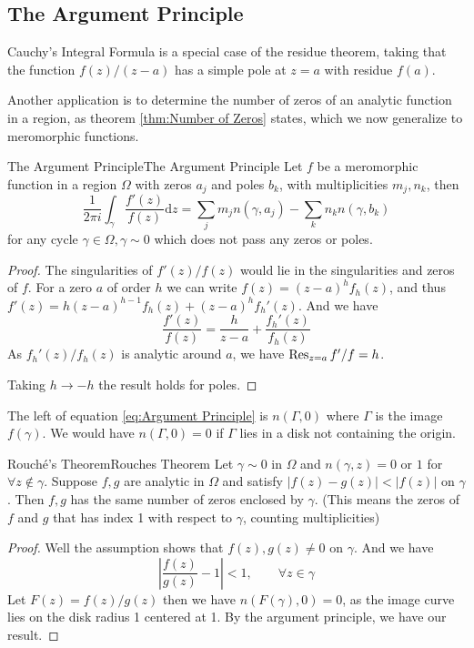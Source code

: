 \documentclass[../main.tex]{subfiles}
\begin{document}
\subsection{The Argument Principle}

Cauchy's Integral Formula is a special case of the residue theorem, taking that the function $f(z) / (z-a)$ has a simple pole at $z=a$ with residue $f(a)$.

Another application is to determine the number of zeros of an analytic function in a region, as theorem \ref{thm:Number of Zeros} states, which we now generalize to meromorphic functions.

\begin{theorem}{The Argument Principle}{The Argument Principle}
	Let $f$ be a meromorphic function in a region $\Omega$ with zeros $a_j$ and poles $b_k$, with multiplicities $m_j,n_k$, then
	\begin{equation}\label{eq:Argument Principle}
		\frac{1}{2 \pi i} \int_{\gamma} \frac{f'(z)}{f(z)} \mathrm{d} z = \sum_{j} m_j n(\gamma,a_j) - \sum_{k} n_k n(\gamma,b_k)
	\end{equation}
	for any cycle $\gamma\in \Omega, \gamma\sim 0$ which does not pass any zeros or poles.
\end{theorem}
\begin{proof}
	The singularities of $f'(z) / f(z)$ would lie in the singularities and zeros of $f$. For a zero $a$ of order $h$ we can write $f(z) = (z-a)^hf_h(z)$, and thus $f'(z) = h(z-a)^{h-1}f_h(z) + (z-a)^h f_h'(z)$. And we have
	\begin{equation*}
		\frac{f'(z)}{f(z)} = \frac{h}{z-a} + \frac{f_h'(z)}{f_h(z)}
	\end{equation*}
	As $f_h'(z) / f_h(z)$ is analytic around $a$, we have $\operatorname{Res}_{z=a} f' / f = h$.
	
	Taking $h \rightarrow -h$ the result holds for poles.
\end{proof}

The left of equation \eqref{eq:Argument Principle} is $n(\Gamma,0)$ where $\Gamma$ is the image $f(\gamma)$. We would have $n(\Gamma,0)=0$ if $\Gamma$ lies in a disk not containing the origin.

\begin{theorem}{Rouch\'e's Theorem}{Rouches Theorem}
	Let $\gamma\sim 0$ in $\Omega$ and $n(\gamma,z)=0$ or $1$ for $\forall z\notin \gamma$. Suppose $f,g$ are analytic in $\Omega$ and satisfy $\left|f(z)-g(z)\right|<\left|f(z)\right|$ on $\gamma$. Then $f,g$ has the same number of zeros enclosed by $\gamma$. (This means the zeros of $f$ and $g$ that has index 1 with respect to $\gamma$, counting multiplicities)
\end{theorem}
\begin{proof}
Well the assumption shows that $f(z),g(z)\neq 0$ on $\gamma$. And we have
\begin{equation*}
	\left|\frac{f(z)}{g(z)}-1\right|<1, \qquad \forall z\in \gamma
\end{equation*}
Let $F(z) = f(z) / g(z)$ then we have $n(F(\gamma),0)=0$, as the image curve lies on the disk radius 1 centered at 1. By the argument principle, we have our result.
\end{proof}
\end{document}
